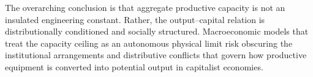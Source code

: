 The overarching conclusion is that aggregate productive capacity is not an insulated engineering constant. Rather, the output--capital relation is distributionally conditioned and socially structured. Macroeconomic models that treat the capacity ceiling as an autonomous physical limit risk obscuring the institutional arrangements and distributive conflicts that govern how productive equipment is converted into potential output in capitalist economies.
